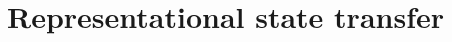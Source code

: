 \documentclass{article}
\begin{document}
\section{Representational state transfer}\label{section:rest}
\end{document}
